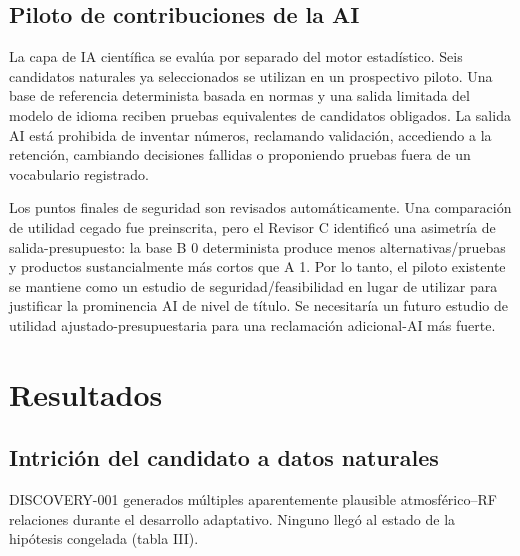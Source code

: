 \documentclass{ieeeaccess}
\begin{document}
\subsection{Piloto de contribuciones de la AI}\label{piloto-de-contribuciones-de-la-ai}

La capa de IA científica se evalúa por separado del motor estadístico. Seis candidatos naturales ya seleccionados se utilizan en un prospectivo piloto. Una base de referencia determinista basada en normas y una salida limitada del modelo de idioma reciben pruebas equivalentes de candidatos obligados. La salida AI está prohibida de inventar números, reclamando validación, accediendo a la retención, cambiando decisiones fallidas o proponiendo pruebas fuera de un vocabulario registrado.

Los puntos finales de seguridad son revisados automáticamente. Una comparación de utilidad cegado fue preinscrita, pero el Revisor C identificó una asimetría de salida-presupuesto: la base B 0 determinista produce menos alternativas/pruebas y productos sustancialmente más cortos que A 1. Por lo tanto, el piloto existente se mantiene como un estudio de seguridad/feasibilidad en lugar de utilizar para justificar la prominencia AI de nivel de título. Se necesitaría un futuro estudio de utilidad ajustado-presupuestaria para una reclamación adicional-AI más fuerte.

\section{Resultados}\label{resultados}

\subsection{Intrición del candidato a datos naturales}\label{intriciuxf3n-del-candidato-a-datos-naturales}

DISCOVERY-001 generados múltiples aparentemente plausible atmosférico--RF relaciones durante el desarrollo adaptativo. Ninguno llegó al estado de la hipótesis congelada (tabla III).
\end{document}
